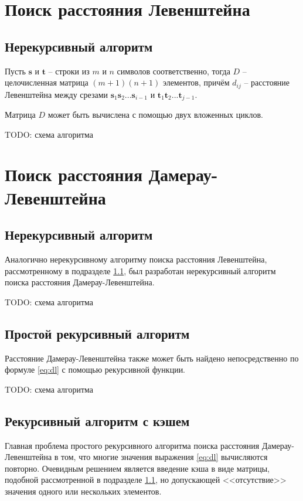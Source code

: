 \documentclass{report}
\begin{document}
\section{Поиск расстояния Левенштейна}

\subsection{Нерекурсивный алгоритм} \label{design-vl-iterative}

Пусть $\textbf{s}$ и $\textbf{t}$ -- строки из $m$ и $n$ символов
соответственно, тогда $D$ -- целочисленная матрица $(m + 1)(n + 1)$
элементов, причём $d_{ij}$ -- расстояние Левенштейна между срезами
$\textbf{s}_1 \textbf{s}_2 ... \textbf{s}_{i - 1}$ и
$\textbf{t}_1 \textbf{t}_2 ... \textbf{t}_{j - 1}$.

Матрица $D$ может быть вычислена с помощью двух вложенных циклов.

TODO: схема алгоритма

\section{Поиск расстояния Дамерау-Левенштейна}

\subsection{Нерекурсивный алгоритм}

Аналогично нерекурсивному алгоритму поиска расстояния Левенштейна,
рассмотренному в подразделе \ref{design-vl-iterative}, был
разработан нерекурсивный алгоритм поиска расстояния
Дамерау-Левенштейна.

TODO: схема алгоритма

\subsection{Простой рекурсивный алгоритм}

Расстояние Дамерау-Левенштейна также может быть найдено
непосредственно по формуле \ref{eq:dl} с помощью рекурсивной
функции.

TODO: схема алгоритма

\subsection{Рекурсивный алгоритм с кэшем}

Главная проблема простого рекурсивного алгоритма поиска расстояния
Дамерау-Левенштейна в том, что многие значения выражения
\ref{eq:dl} вычисляются повторно. Очевидным решением является
введение кэша в виде матрицы, подобной рассмотренной в подразделе
\ref{design-vl-iterative}, но допускающей <<отсутствие>> значения
одного или нескольких элементов.
\end{document}
